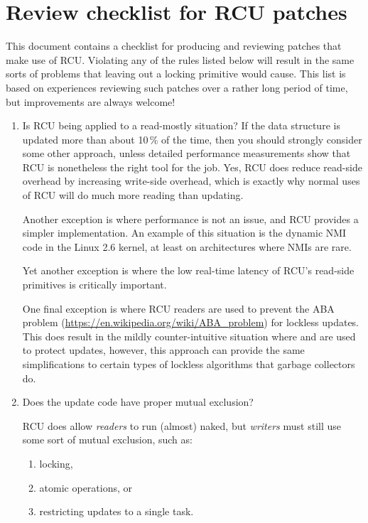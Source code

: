 
\section{Review checklist for RCU patches}
\label{sec:rcu:Review checklist for RCU patches}

This document contains a checklist for producing and reviewing patches
that make use of RCU\@.
Violating any of the rules listed below will
result in the same sorts of problems that leaving out a locking primitive
would cause.
This list is based on experiences reviewing such patches
over a rather long period of time, but improvements are always welcome!

\begin{enumerate}[start=0]
\item	Is RCU being applied to a read-mostly situation?
	If the data
	structure is updated more than about 10\,\% of the time, then you
	should strongly consider some other approach, unless detailed
	performance measurements show that RCU is nonetheless the right
	tool for the job.
	Yes, RCU does reduce read-side overhead by
	increasing write-side overhead, which is exactly why normal uses
	of RCU will do much more reading than updating.

	Another exception is where performance is not an issue, and RCU
	provides a simpler implementation.
	An example of this situation
	is the dynamic NMI code in the Linux 2.6 kernel, at least on
	architectures where NMIs are rare.

	Yet another exception is where the low real-time latency of RCU's
	read-side primitives is critically important.

	One final exception is where RCU readers are used to prevent
	the ABA problem (\url{https://en.wikipedia.org/wiki/ABA_problem})
	for lockless updates.
	This does result in the mildly
	counter-intuitive situation where  and
	 are used to protect updates, however, this
	approach can provide the same simplifications to certain types
	of lockless algorithms that garbage collectors do.

\item	Does the update code have proper mutual exclusion?

	RCU does allow \emph{readers} to run (almost) naked, but
	\emph{writers} must
	still use some sort of mutual exclusion, such as:

	\begin{enumerate}
	\item	locking,
	\item	atomic operations, or
	\item	restricting updates to a single task.
	\end{enumerate}


\end{enumerate}
